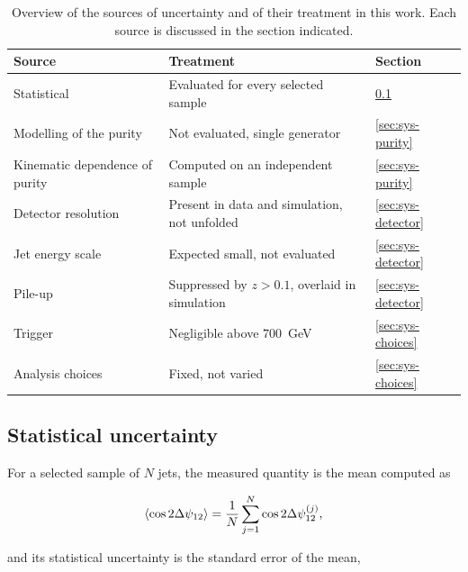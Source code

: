 \begin{table}[htbp]
  \centering
  \caption{Overview of the sources of uncertainty and of their treatment in this
  work. Each source is discussed in the section indicated.}
  \label{tab:systematics}
  \begin{tabular}{lll}
    \toprule
    Source & Treatment & Section \\
    \midrule
    Statistical                     & Evaluated for every selected sample
                                    & \ref{sec:sys-stat} \\
    Modelling of the purity         & Not evaluated, single generator
                                    & \ref{sec:sys-purity} \\
    Kinematic dependence of purity  & Computed on an independent sample
                                    & \ref{sec:sys-purity} \\
    Detector resolution             & Present in data and simulation, not unfolded
                                    & \ref{sec:sys-detector} \\
    Jet energy scale                & Expected small, not evaluated
                                    & \ref{sec:sys-detector} \\
    Pile-up                         & Suppressed by $z > 0.1$, overlaid in simulation
                                    & \ref{sec:sys-detector} \\
    Trigger                         & Negligible above $700$~GeV
                                    & \ref{sec:sys-choices} \\
    Analysis choices                & Fixed, not varied
                                    & \ref{sec:sys-choices} \\
    \bottomrule
  \end{tabular}
\end{table}

\subsection{Statistical uncertainty}
\label{sec:sys-stat}

For a selected sample of $N$ jets, the measured quantity is the mean computed as

\begin{equation}
  \langle \cos 2\Delta\psi_{12} \rangle = \frac{1}{N}\sum_{j=1}^{N} \cos 2\Delta\psi_{12}^{(j)},
  \label{eq:mean-cos}
\end{equation}

and its statistical uncertainty is the standard error of the mean,

